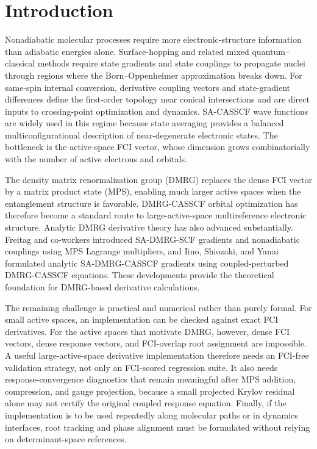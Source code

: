 \documentclass[journal=jctcce,manuscript=article]{achemso}
\begin{document}
\section{Introduction}
Nonadiabatic molecular processes require more electronic-structure information than adiabatic energies alone.
Surface-hopping and related mixed quantum--classical methods require state gradients and state couplings to propagate nuclei through regions where the Born--Oppenheimer approximation breaks down.\cite{Tully1990,Richter2011SHARC,Mai2018SHARC}
For same-spin internal conversion, derivative coupling vectors and state-gradient differences define the first-order topology near conical intersections and are direct inputs to crossing-point optimization and dynamics.\cite{Yarkony1996,Bernardi1996,Bearpark1994,FdezGalvan2016}
SA-CASSCF wave functions are widely used in this regime because state averaging provides a balanced multiconfigurational description of near-degenerate electronic states.\cite{Roos1980CASSCF,KnowlesWerner1985MCSCF}
The bottleneck is the active-space FCI vector, whose dimension grows combinatorially with the number of active electrons and orbitals.

The density matrix renormalization group (DMRG) replaces the dense FCI vector by a matrix product state (MPS), enabling much larger active spaces when the entanglement structure is favorable.\cite{White1992DMRG,WhiteMartin1999DMRG,RommerOstlund1997MPS,ChanHeadGordon2002,ChanSharma2011,SharmaChan2012}
DMRG-CASSCF orbital optimization has therefore become a standard route to large-active-space multireference electronic structure.\cite{ZgidNooijen2008,Ghosh2008,Wouters2014DMRGReview,OlivaresAmaya2015DMRGPractice,Wouters2014CheMPS2}
Analytic DMRG derivative theory has also advanced substantially.
Freitag and co-workers introduced SA-DMRG-SCF gradients and nonadiabatic couplings using MPS Lagrange multipliers, and Iino, Shiozaki, and Yanai formulated analytic SA-DMRG-CASSCF gradients using coupled-perturbed DMRG-CASSCF equations.\cite{Freitag2019,Iino2023}
These developments provide the theoretical foundation for DMRG-based derivative calculations.

The remaining challenge is practical and numerical rather than purely formal.
For small active spaces, an implementation can be checked against exact FCI derivatives.
For the active spaces that motivate DMRG, however, dense FCI vectors, dense response vectors, and FCI-overlap root assignment are impossible.
A useful large-active-space derivative implementation therefore needs an FCI-free validation strategy, not only an FCI-scored regression suite.
It also needs response-convergence diagnostics that remain meaningful after MPS addition, compression, and gauge projection, because a small projected Krylov residual alone may not certify the original coupled response equation.
Finally, if the implementation is to be used repeatedly along molecular paths or in dynamics interfaces, root tracking and phase alignment must be formulated without relying on determinant-space references.
\end{document}
